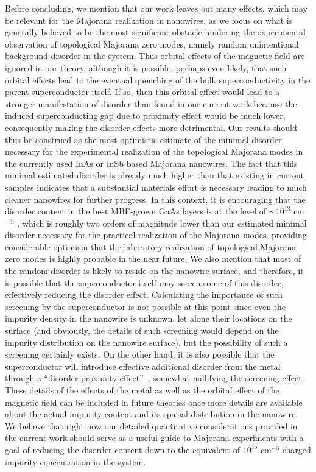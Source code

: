\documentclass[aps,prmaterials,twocolumn,superscriptaddress,longbibliography]{revtex4-2}
\begin{document}
{Before concluding, we mention that our work leaves out many effects, which may be relevant for the Majorana realization in nanowires, as we focus on what is generally believed to be the most significant obstacle hindering the experimental observation of topological Majorana zero modes, namely random unintentional background disorder in the system.  Thus orbital effects of the magnetic field are ignored in our theory, although it is possible, perhaps even likely, that such orbital effects lead to the eventual quenching of the bulk superconductivity in the parent superconductor itself.  If so, then this orbital effect would lead to a stronger manifestation of disorder than found in our current work because the induced superconducting gap due to proximity effect would be much lower, consequently making the disorder effects more detrimental.  Our results should thus be construed as the most optimistic estimate of the minimal disorder necessary for the experimental realization of the topological Majorana modes in the currently used InAs or InSb based Majorana nanowires.  The fact that this minimal estimated disorder is already much higher than that existing in current samples indicates that a substantial materials effort is necessary leading to much cleaner nanowires for further progress.  In this context, it is encouraging that the disorder content in the best MBE-grown GaAs layers is at the level of $\sim 10^{13}$  cm$^{-3}$~\cite{dassarma2015transport}, which is roughly two orders of magnitude lower than our estimated minimal disorder necessary for the practical realization of the Majorana modes, providing considerable optimism that the laboratory realization of topological Majorana zero modes is highly probable in the near future.  We also mention that most of the random disorder is likely to reside on the nanowire surface, and therefore, it is possible that the superconductor itself may screen some of this disorder, effectively reducing the disorder effect.  Calculating the importance of such screening by the superconductor is not possible at this point since even the impurity density in the nanowire is unknown, let alone their locations on the surface (and obviously, the details of such screening would depend on the impurity distribution on the nanowire surface), but the possibility of such a screening certainly exists.  On the other hand, it is also possible that the superconductor will introduce effective additional disorder from the metal through a ``disorder proximity effect''~\cite{cole2016proximity}, somewhat nullifying the screening effect.  These details of the effects of the metal as well as the orbital effect of the magnetic field can be included in future theories once more details are available about the actual impurity content and its spatial distribution in the nanowire.  We believe that right now our detailed quantitative considerations provided in the current work should serve as a useful guide to Majorana experiments with a goal of reducing the disorder content down to the equivalent of $10^{15}$ cm$^{-3}$ charged impurity concentration in the system.}
\end{document}
